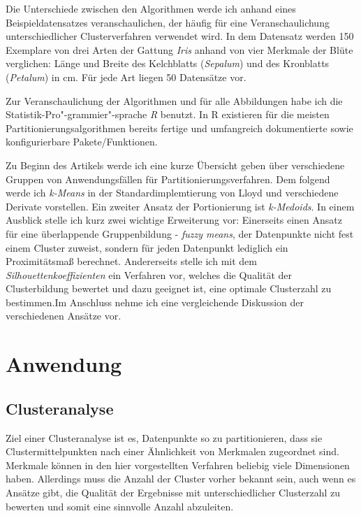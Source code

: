 \documentclass[a4paper,12pt,twoside]{article}
\newcommand{\Fachbegriff}[1]{\textit{#1}}
\begin{document}
Die Unterschiede zwischen den Algorithmen werde ich anhand eines Beispieldatensatzes veranschaulichen, der häufig für eine Veranschaulichung unterschiedlicher Clusterverfahren verwendet wird. In dem Datensatz werden 150 Exemplare von drei Arten der Gattung \Fachbegriff{Iris} anhand von vier Merkmale der Blüte verglichen: Länge und Breite des Kelchblatts (\Fachbegriff{Sepalum}) und des Kronblatts (\Fachbegriff{Petalum}) in cm. Für jede Art liegen 50 Datensätze vor. \autocite{FISHER.1936, Wikipedia.}

Zur Veranschaulichung der Algorithmen und für alle Abbildungen habe ich die Statistik-Pro"-grammier"-sprache \Fachbegriff{R} benutzt. In R existieren für die meisten Partitionierungsalgorithmen bereits fertige und umfangreich dokumentierte sowie konfigurierbare Pakete/Funktionen.  

Zu Beginn des Artikels werde ich eine kurze Übersicht geben über verschiedene Gruppen von Anwendungsfällen für Partitionierungsverfahren. Dem folgend werde ich \Fachbegriff{k-Means} in der Standardimplemtierung von Lloyd und verschiedene Derivate vorstellen. Ein zweiter Ansatz der Portionierung ist \Fachbegriff{k-Medoids}. In einem Ausblick stelle ich kurz zwei wichtige Erweiterung vor: Einerseits einen Ansatz für eine überlappende Gruppenbildung - \Fachbegriff{fuzzy means}, der Datenpunkte nicht fest einem Cluster zuweist, sondern für jeden Datenpunkt lediglich ein Proximitätsmaß berechnet. Andererseits stelle ich mit dem \Fachbegriff{Silhouettenkoeffizienten} ein Verfahren vor, welches die Qualität der Clusterbildung bewertet und dazu geeignet ist, eine optimale Clusterzahl zu bestimmen.Im Anschluss nehme ich eine vergleichende Diskussion der verschiedenen Ansätze vor.

\section{Anwendung}

\subsection{Clusteranalyse}
Ziel einer Clusteranalyse ist es, Datenpunkte so zu partitionieren, dass sie Clustermittelpunkten nach einer Ähnlichkeit von Merkmalen zugeordnet sind. Merkmale können in den hier vorgestellten Verfahren beliebig viele Dimensionen haben. Allerdings muss die Anzahl der Cluster vorher bekannt sein, auch wenn es Ansätze gibt, die Qualität der Ergebnisse mit unterschiedlicher Clusterzahl zu bewerten und somit eine sinnvolle Anzahl abzuleiten. \autocite[][284f]{DavidMacKay.2003}
\end{document}
